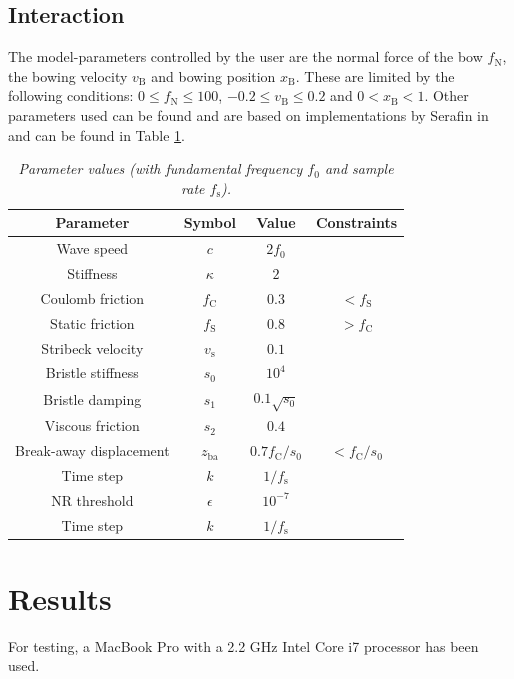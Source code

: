 \documentclass[twoside,a4paper]{article}
\begin{document}
\subsection{Interaction}
The model-parameters controlled by the user are the normal force of the bow $f_\text{N}$, the bowing velocity $v_\text{B}$ and bowing position $x_\text{B}$. These are limited by the following conditions: $0 \leq f_\text{N} \leq 100$, $-0.2 \leq v_\text{B} \leq 0.2$ and $0<x_\text{B}<1$. Other parameters used can be found 
and are based on implementations by Serafin in \cite{Serafin2004} and can be found in Table \ref{tab:parameters}.
    
\begin{table}[ht]
  \caption{{\it Parameter values (with fundamental frequency $f_0$ and sample rate $f_\text{s}$).}}
	\centering
  \begin{tabular}{|c|c|c|c|}\hline
    Parameter & Symbol & Value & Constraints\\ \hline
    Wave speed & $c$ & $2 f_0$ & \\
    Stiffness & $\kappa$ & $2$ & \\
    Coulomb friction & $f_\text{C}$ & $0.3$ & $<f_\text{S}$ \\
    Static friction & $f_\text{S}$ & $0.8$ & $>f_\text{C}$ \\
    Stribeck velocity & $v_\text{s}$ & $0.1$ & \\
    Bristle stiffness & $s_0$ & $10^4$ & \\
    Bristle damping & $s_1$ & $0.1\sqrt{s_0}$ & \\
    Viscous friction & $s_2$ & $0.4$ & \\
    Break-away displacement & $z_\text{ba}$ & $0.7 f_\text{C}/s_0$ & $<f_\text{C}/s_0$ \\
    Time step & $k$ & $1/f_\text{s}$ & \\
    NR threshold & $\epsilon$ & $10^{-7}$ & \\
    Time step & $k$ & $1/f_\text{s}$ & \\
    \hline
 \end{tabular}
  \label{tab:parameters}
\end{table}

\section{Results}\label{sec:results}
For testing, a MacBook Pro with a 2.2 GHz Intel Core i7 processor has been used. 
\end{document}
